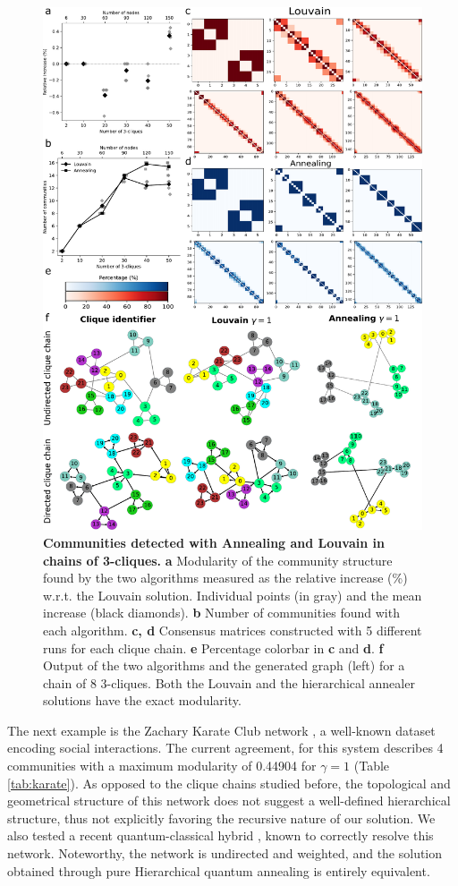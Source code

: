 \documentclass[pdflatex,sn-mathphys-num]{sn-jnl}%
\begin{document}
\begin{figure}
    \centering
    \includegraphics[width=.9\linewidth]{Figures/Fig1.pdf}
    \caption{\textbf{Communities detected with Annealing and Louvain in chains of 3-cliques.} \textbf{a} Modularity of the community structure found by the two algorithms measured as the relative increase (\%) w.r.t. the Louvain solution. Individual points (in gray) and the mean increase (black diamonds). \textbf{b} Number of communities found with each algorithm. \textbf{c, d} Consensus matrices constructed with 5 different runs for each clique chain. \textbf{e} Percentage colorbar in \textbf{c} and \textbf{d}. \textbf{f} Output of the two algorithms and the generated graph (left) for a chain of 8 3-cliques. Both the Louvain and the hierarchical annealer solutions have the exact modularity.}
    \label{fig:clique-chains}
\end{figure}

The next example is the Zachary Karate Club network \cite{zachary1977information}, a well-known dataset encoding social interactions. The current agreement, for this system describes 4 communities with a maximum modularity of 0.44904 for $\gamma=1$ (Table \ref{tab:karate}). As opposed to the clique chains studied before, the topological and geometrical structure of this network does not suggest a well-defined hierarchical structure, thus not explicitly favoring the recursive nature of our solution. We also tested a recent quantum-classical hybrid \cite{Wierzbinski2023}, known to correctly resolve this network. Noteworthy, the network is undirected and weighted, and the solution obtained through pure Hierarchical quantum annealing is entirely equivalent.
\end{document}
